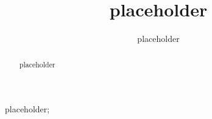 \begin{frontmatter}
    \title{placeholder}

    \author[1]{placeholder}

    \address[1]{placeholder}

    \begin{abstract}
        placeholder
    \end{abstract}

    \begin{keyword}
        placeholder;
    \end{keyword}
\end{frontmatter}
